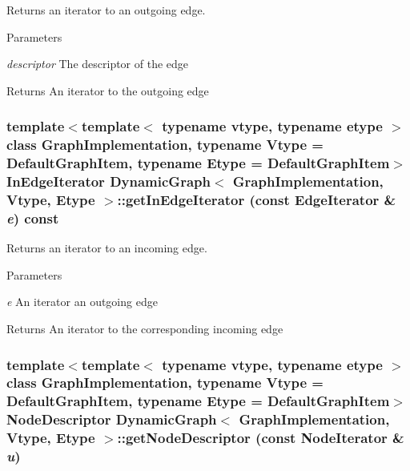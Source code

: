 Returns an iterator to an outgoing edge. 


\begin{DoxyParams}{Parameters}
\item[{\em descriptor}]The descriptor of the edge \end{DoxyParams}
\begin{DoxyReturn}{Returns}
An iterator to the outgoing edge 
\end{DoxyReturn}
\hypertarget{class_dynamic_graph_a35a595f7a88c5a21330f593dcdedad66}{
\subsubsection[{getInEdgeIterator}]{\setlength{\rightskip}{0pt plus 5cm}template$<$template$<$ typename vtype, typename etype $>$ class GraphImplementation, typename Vtype  = DefaultGraphItem, typename Etype  = DefaultGraphItem$>$ InEdgeIterator {\bf DynamicGraph}$<$ GraphImplementation, Vtype, Etype $>$::getInEdgeIterator (const EdgeIterator \& {\em e}) const}}
\label{class_dynamic_graph_a35a595f7a88c5a21330f593dcdedad66}


Returns an iterator to an incoming edge. 


\begin{DoxyParams}{Parameters}
\item[{\em e}]An iterator an outgoing edge \end{DoxyParams}
\begin{DoxyReturn}{Returns}
An iterator to the corresponding incoming edge 
\end{DoxyReturn}
\hypertarget{class_dynamic_graph_a12266de606b1d32d76aeb58458d033dd}{
\subsubsection[{getNodeDescriptor}]{\setlength{\rightskip}{0pt plus 5cm}template$<$template$<$ typename vtype, typename etype $>$ class GraphImplementation, typename Vtype  = DefaultGraphItem, typename Etype  = DefaultGraphItem$>$ NodeDescriptor {\bf DynamicGraph}$<$ GraphImplementation, Vtype, Etype $>$::getNodeDescriptor (const NodeIterator \& {\em u})}}
\label{class_dynamic_graph_a12266de606b1d32d76aeb58458d033dd}


